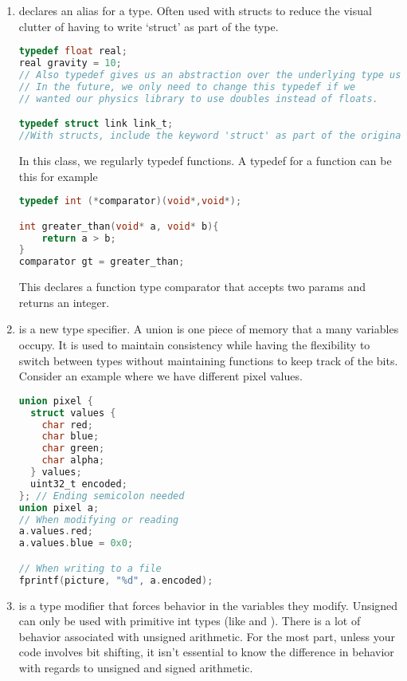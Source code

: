 \begin{enumerate}
	    \item {} declares an alias for a type.
        Often used with structs to reduce the visual clutter of having to write `struct' as part of the type.

	      \begin{lstlisting}[language=C]
typedef float real;
real gravity = 10;
// Also typedef gives us an abstraction over the underlying type used.
// In the future, we only need to change this typedef if we
// wanted our physics library to use doubles instead of floats.

typedef struct link link_t;
//With structs, include the keyword 'struct' as part of the original types
\end{lstlisting}

	      In this class, we regularly typedef functions.
        A typedef for a function can be this for example

	      \begin{lstlisting}[language=C]
typedef int (*comparator)(void*,void*);

int greater_than(void* a, void* b){
    return a > b;
}
comparator gt = greater_than;
\end{lstlisting}

	      This declares a function type comparator that accepts two  params and returns an integer.

	    \item {} is a new type specifier.
        A union is one piece of memory that a many variables occupy.
        It is used to maintain consistency while having the flexibility to switch between types without maintaining functions to keep track of the bits.
        Consider an example where we have different pixel values.
	      \begin{lstlisting}[language=C]
union pixel {
  struct values {
    char red;
    char blue;
    char green;
    char alpha;
  } values;
  uint32_t encoded;
}; // Ending semicolon needed
union pixel a;
// When modifying or reading
a.values.red;
a.values.blue = 0x0;

// When writing to a file
fprintf(picture, "%d", a.encoded);
\end{lstlisting}

	    \item {} is a type modifier that forces  behavior in the variables they modify.
        Unsigned can only be used with primitive int types (like  and ).
        There is a lot of behavior associated with unsigned arithmetic. For the most part, unless your code involves bit shifting, it isn't essential to know the difference in behavior with regards to unsigned and signed arithmetic.


\end{enumerate}
